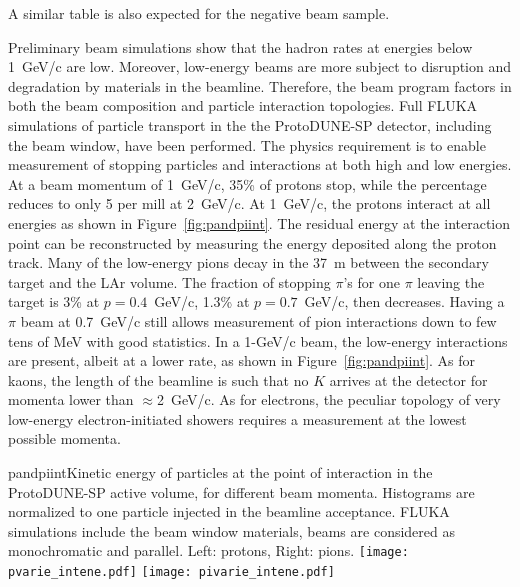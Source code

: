 A similar table is also expected for the negative beam sample. 

Preliminary beam simulations show that the hadron rates at 
energies below 1~GeV/c are low. Moreover, low-energy beams are more
subject to disruption and degradation by materials in the
beamline.  Therefore, the beam program factors in both the beam composition and %
particle interaction topologies.  Full FLUKA\cite{fluka05,Fluka15}
 simulations
of particle transport in the the ProtoDUNE-SP detector, including the
beam window, have been performed.
 The physics requirement  is %
 to enable measurement of
 stopping particles and  interactions at both high and low energies.    
%
At a beam momentum of 1~GeV/c, 35\% of protons stop, while the percentage reduces to only 5
per mill at 2~GeV/c. 
  At  1~GeV/c,  the protons interact at all
energies as shown in
Figure~\ref{fig:pandpiint}. 
The residual energy at the interaction
point can be reconstructed by measuring the energy deposited along the proton track.
Many of the  low-energy pions decay in the 37~m between the secondary target
and the LAr volume.  The fraction of stopping $\pi$'s for one $\pi$
leaving the target is 3\% at $p=0.4$~GeV/c,  %
1.3\% at $p=0.7$~GeV/c,
then decreases.  Having a $\pi$ beam at 0.7~GeV/c still allows 
measurement of pion interactions down to few tens of MeV with good
statistics. In a 1-GeV/c beam, the low-energy interactions are %
present, albeit at a %
lower rate, as shown in Figure~\ref{fig:pandpiint}.
%
As for kaons, the length of the beamline is such that no
$K$ arrives at the detector for momenta lower than $\approx$2~GeV/c.
As for electrons, the peculiar topology of very low-energy electron-initiated 
showers requires a measurement at the lowest possible momenta.
\begin{cdrfigure}{pandpiint}{Kinetic energy of
    particles at the point of interaction in the ProtoDUNE-SP active
    volume, for different beam momenta. Histograms are normalized to one particle injected in the
    beamline acceptance. FLUKA simulations include the beam window
    materials, beams are considered as monochromatic and
    parallel. Left: protons, Right: pions.}
  \texttt{[image: pvarie\_intene.pdf]}
  \texttt{[image: pivarie\_intene.pdf]}
\end{cdrfigure}

